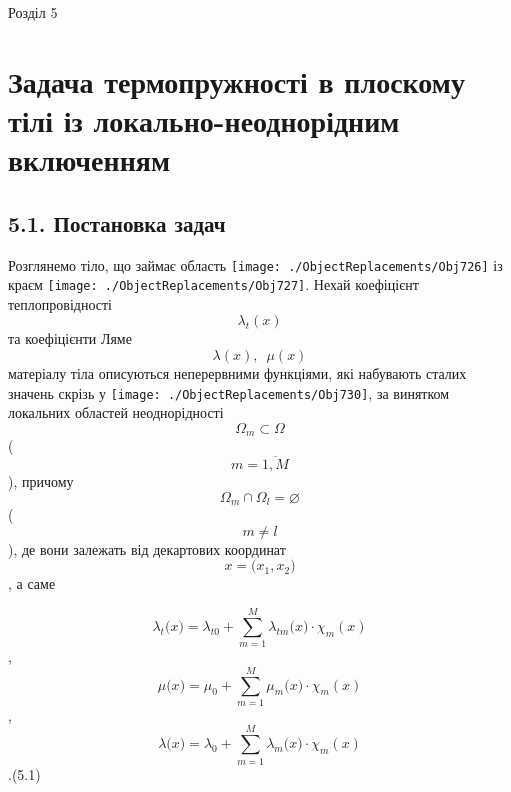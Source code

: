 Розділ 5

\hypertarget{ux437ux430ux434ux430ux447ux430-ux442ux435ux440ux43cux43eux43fux440ux443ux436ux43dux43eux441ux442ux456-ux432-ux43fux43bux43eux441ux43aux43eux43cux443-ux442ux456ux43bux456-ux456ux437-ux43bux43eux43aux430ux43bux44cux43dux43e-ux43dux435ux43eux434ux43dux43eux440ux456ux434ux43dux438ux43c-ux432ux43aux43bux44eux447ux435ux43dux43dux44fux43c}{%
\section[Задача термопружності в плоскому тілі із локально-неоднорідним
включенням]{\texorpdfstring{\protect\hypertarget{anchor-60}{}{}Задача
термопружності в плоскому тілі із локально-неоднорідним
включенням}{Задача термопружності в плоскому тілі із локально-неоднорідним включенням}}\label{ux437ux430ux434ux430ux447ux430-ux442ux435ux440ux43cux43eux43fux440ux443ux436ux43dux43eux441ux442ux456-ux432-ux43fux43bux43eux441ux43aux43eux43cux443-ux442ux456ux43bux456-ux456ux437-ux43bux43eux43aux430ux43bux44cux43dux43e-ux43dux435ux43eux434ux43dux43eux440ux456ux434ux43dux438ux43c-ux432ux43aux43bux44eux447ux435ux43dux43dux44fux43c}}

\hypertarget{ux43fux43eux441ux442ux430ux43dux43eux432ux43aux430-ux437ux430ux434ux430ux447}{%
\subsection[5.1. Постановка
задач]{\texorpdfstring{\protect\hypertarget{anchor-61}{}{}5.1.
Постановка
задач}{5.1. Постановка задач}}\label{ux43fux43eux441ux442ux430ux43dux43eux432ux43aux430-ux437ux430ux434ux430ux447}}

Розглянемо тіло, що займає область
\texttt{[image: ./ObjectReplacements/Obj726]}
із краєм
\texttt{[image: ./ObjectReplacements/Obj727]}.
Нехай коефіцієнт теплопровідності \[{\lambda_{t}(x)}{}\] та коефіцієнти
Ляме \[{\lambda(x),\mspace{9mu}\mu(x)}{}\] матеріалу тіла описуються
неперервними функціями, які набувають сталих значень скрізь у
\texttt{[image: ./ObjectReplacements/Obj730]},
за винятком локальних областей неоднорідності
\[{\Omega_{m}\subset\Omega}{}\] (\[{m = \overline{1,M}}{}\]), причому
\[{{\Omega_{m} \cap \Omega_{l}} = \varnothing}{}\](\[{m \neq l}{}\]), де
вони залежать від декартових координат \[{{x = (}x_{1},x_{2})}{}\], а
саме

\[{\lambda_{t}(x{) = {\lambda_{t0} + {\sum\limits_{m = 1}^{M}{\lambda_{\mathit{\text{tm}}}(x{) \cdot \chi_{m}}(x)}}}}}{}\],
\[{\mu(x{) = {\mu_{0} + {\sum\limits_{m = 1}^{M}{\mu_{m}(x{) \cdot \chi_{m}}(x)}}}}}{}\],
\[{\lambda(x{) = {\lambda_{0} + {\sum\limits_{m = 1}^{M}{\lambda_{m}(x{) \cdot \chi_{m}}(x)}}}}}{}\].(5.1)

